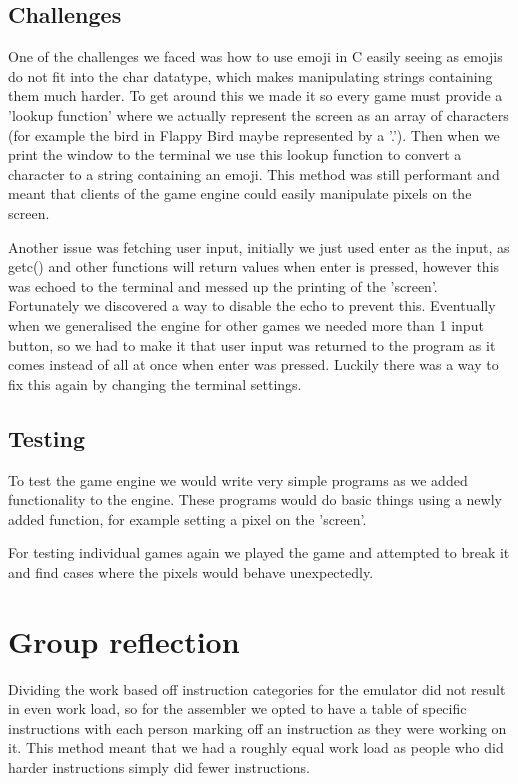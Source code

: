 \documentclass{article}
\begin{document}
\subsection{Challenges}
One of the challenges we faced was how to use emoji in C easily seeing as emojis do not fit into the char datatype, which makes manipulating strings containing them much harder. To get around this we made it so every game must provide a 'lookup function' where we actually represent the screen as an array of characters (for example the bird in Flappy Bird maybe represented by a '.'). Then when we print the window to the terminal we use this lookup function to convert a character to a string containing an emoji. This method was still performant and meant that clients of the game engine could easily manipulate pixels on the screen.

Another issue was fetching user input, initially we just used enter as the input, as getc() and other functions will return values when enter is pressed, however this was echoed to the terminal and messed up the printing of the 'screen'. Fortunately we discovered a way to disable the echo to prevent this. Eventually when we generalised the engine for other games we needed more than 1 input button, so we had to make it that user input was returned to the program as it comes instead of all at once when enter was pressed. Luckily there was a way to fix this again by changing the terminal settings.

\subsection{Testing}
To test the game engine we would write very simple programs as we added functionality to the engine. These programs would do basic things using a newly added function, for example setting a pixel on the 'screen'. 

For testing individual games again we played the game and attempted to break it and find cases where the pixels would behave unexpectedly.

\section{Group reflection}
Dividing the work based off instruction categories for the emulator did not result in even work load, so for the assembler we opted to have a table of specific instructions with each person marking off an instruction as they were working on it. This method meant that we had a roughly equal work load as people who did harder instructions simply did fewer instructions.
\end{document}

